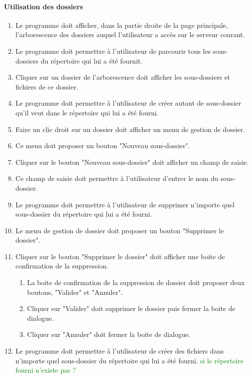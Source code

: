 \documentclass[10pt,a4paper]{report}
\begin{document}
\paragraph{Utilisation des dossiers}
	\begin{enumerate}
		\item Le programme doit afficher, dans la partie droite de la page principale, l'arborescence des dossiers auquel l'utilisateur a accès sur le serveur courant.
		\item Le programme doit permettre à l'utilisateur de parcourir tous les sous-dossiers du répertoire qui lui a été fournit.
		\item Cliquer sur un dossier de l'arborescence doit afficher les sous-dossiers et fichiers de ce dossier.
		\item Le programme doit permettre à l'utilisateur de créer autant de sous-dossier qu'il veut dans le répertoire qui lui a été fourni.
		\item Faire un clic droit sur un dossier doit afficher un menu de gestion de dossier.
		\item Ce menu doit proposer un bouton "Nouveau sous-dossier".
		\item Cliquer sur le bouton "Nouveau sous-dossier" doit afficher un champ de saisie.
		\item Ce champ de saisie doit permettre à l'utilisateur d'entrer le nom du sous-dossier.
		\item Le programme doit permettre à l'utilisateur de supprimer n'importe quel sous-dossier du répertoire qui lui a été fourni.
		\item Le menu de gestion de dossier doit proposer un bouton "Supprimer le dossier".
		\item Cliquer sur le bouton "Supprimer le dossier" doit afficher une boite de confirmation de la suppression.
		\begin{enumerate}[label=\arabic*.]
			\item La boite de confirmation de la suppression de dossier doit proposer deux boutons, "Valider" et "Annuler".
			\item Cliquer sur "Valider" doit supprimer le dossier puis fermer la boite de dialogue.
			\item Cliquer sur "Annuler" doit fermer la boite de dialogue.
		\end{enumerate}
		\item Le programme doit permettre à l'utilisateur de créer des fichiers dans n'importe quel sous-dossier du répertoire qui lui a été fourni.\textcolor{green}{ si le répertoire fourni n'existe pas ?}

\end{enumerate}
\end{document}
